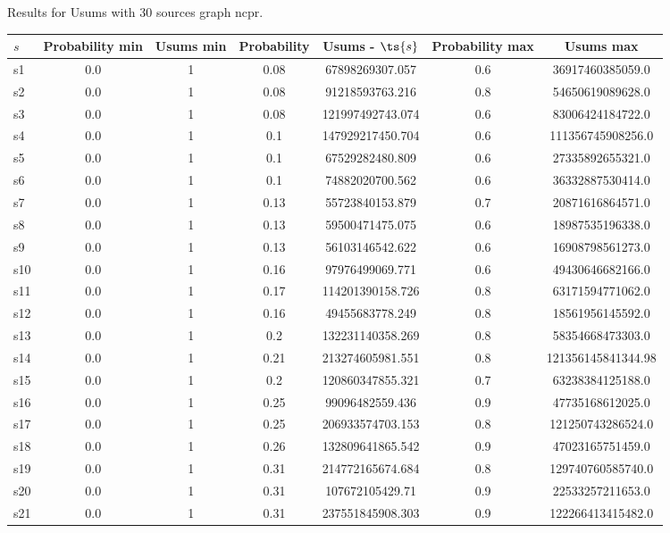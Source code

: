 \documentclass{article}
\begin{document}
\noindent Results for Usums with 30 sources graph ncpr.

\noindent\begin{tabular}{|l|c|c|c|c|c|c|}
\hline
$s$& Probability min & Usums min & Probability & Usums - $\ts{s}$ & Probability max & Usums max\\
\hline
s1 &0.0 & 1 & 0.08 & 67898269307.057 & 0.6 & 36917460385059.0\\
\hline
s2 &0.0 & 1 & 0.08 & 91218593763.216 & 0.8 & 54650619089628.0\\
\hline
s3 &0.0 & 1 & 0.08 & 121997492743.074 & 0.6 & 83006424184722.0\\
\hline
s4 &0.0 & 1 & 0.1 & 147929217450.704 & 0.6 & 111356745908256.0\\
\hline
s5 &0.0 & 1 & 0.1 & 67529282480.809 & 0.6 & 27335892655321.0\\
\hline
s6 &0.0 & 1 & 0.1 & 74882020700.562 & 0.6 & 36332887530414.0\\
\hline
s7 &0.0 & 1 & 0.13 & 55723840153.879 & 0.7 & 20871616864571.0\\
\hline
s8 &0.0 & 1 & 0.13 & 59500471475.075 & 0.6 & 18987535196338.0\\
\hline
s9 &0.0 & 1 & 0.13 & 56103146542.622 & 0.6 & 16908798561273.0\\
\hline
s10 &0.0 & 1 & 0.16 & 97976499069.771 & 0.6 & 49430646682166.0\\
\hline
s11 &0.0 & 1 & 0.17 & 114201390158.726 & 0.8 & 63171594771062.0\\
\hline
s12 &0.0 & 1 & 0.16 & 49455683778.249 & 0.8 & 18561956145592.0\\
\hline
s13 &0.0 & 1 & 0.2 & 132231140358.269 & 0.8 & 58354668473303.0\\
\hline
s14 &0.0 & 1 & 0.21 & 213274605981.551 & 0.8 & 121356145841344.98\\
\hline
s15 &0.0 & 1 & 0.2 & 120860347855.321 & 0.7 & 63238384125188.0\\
\hline
s16 &0.0 & 1 & 0.25 & 99096482559.436 & 0.9 & 47735168612025.0\\
\hline
s17 &0.0 & 1 & 0.25 & 206933574703.153 & 0.8 & 121250743286524.0\\
\hline
s18 &0.0 & 1 & 0.26 & 132809641865.542 & 0.9 & 47023165751459.0\\
\hline
s19 &0.0 & 1 & 0.31 & 214772165674.684 & 0.8 & 129740760585740.0\\
\hline
s20 &0.0 & 1 & 0.31 & 107672105429.71 & 0.9 & 22533257211653.0\\
\hline
s21 &0.0 & 1 & 0.31 & 237551845908.303 & 0.9 & 122266413415482.0\\

\end{tabular}
\end{document}
